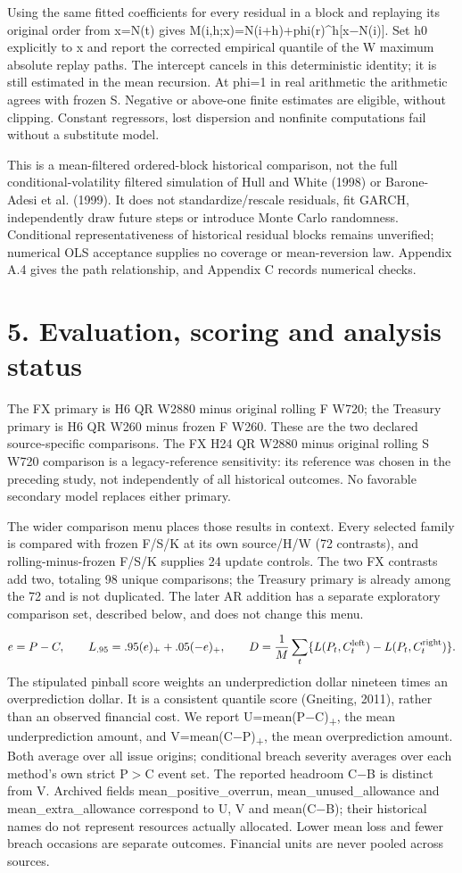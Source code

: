 \documentclass[10pt,a4paper]{article}
\begin{document}
Using the same fitted coefficients for every residual in a block and replaying its original order from x=N(t) gives M(i,h;x)=N(i+h)+phi(r)\textasciicircum{}h[x\(-\)N(i)]. Set h0 explicitly to x and report the corrected empirical quantile of the W maximum absolute replay paths. The intercept cancels in this deterministic identity; it is still estimated in the mean recursion. At phi=1 in real arithmetic the arithmetic agrees with frozen S. Negative or above-one finite estimates are eligible, without clipping. Constant regressors, lost dispersion and nonfinite computations fail without a substitute model.

This is a mean-filtered ordered-block historical comparison, not the full conditional-volatility filtered simulation of Hull and White (1998) or Barone-Adesi et al. (1999). It does not standardize/rescale residuals, fit GARCH, independently draw future steps or introduce Monte Carlo randomness. Conditional representativeness of historical residual blocks remains unverified; numerical OLS acceptance supplies no coverage or mean-reversion law. Appendix A.4 gives the path relationship, and Appendix C records numerical checks.

\section*{5. Evaluation, scoring and analysis status}
The FX primary is H6 QR W2880 minus original rolling F W720; the Treasury primary is H6 QR W260 minus frozen F W260. These are the two declared source-specific comparisons. The FX H24 QR W2880 minus original rolling S W720 comparison is a legacy-reference sensitivity: its reference was chosen in the preceding study, not independently of all historical outcomes. No favorable secondary model replaces either primary.

The wider comparison menu places those results in context. Every selected family is compared with frozen F/S/K at its own source/H/W (72 contrasts), and rolling-minus-frozen F/S/K supplies 24 update controls. The two FX contrasts add two, totaling 98 unique comparisons; the Treasury primary is already among the 72 and is not duplicated. The later AR addition has a separate exploratory comparison set, described below, and does not change this menu.

\[
e=P-C,\qquad L_{.95}=.95(e)_+ +.05(-e)_+,\qquad D=\frac1M\sum_t\{L(P_t,C_t^{\rm left})-L(P_t,C_t^{\rm right})\}.
\]
The stipulated pinball score weights an underprediction dollar nineteen times an overprediction dollar. It is a consistent quantile score (Gneiting, 2011), rather than an observed financial cost. We report U=mean(P\(-\)C)\textsubscript{+}, the mean underprediction amount, and V=mean(C\(-\)P)\textsubscript{+}, the mean overprediction amount. Both average over all issue origins; conditional breach severity averages over each method's own strict P\( > \)C event set. The reported headroom C\(-\)B is distinct from V. Archived fields mean\_positive\_overrun, mean\_unused\_allowance and mean\_extra\_allowance correspond to U, V and mean(C\(-\)B); their historical names do not represent resources actually allocated. Lower mean loss and fewer breach occasions are separate outcomes. Financial units are never pooled across sources.
\end{document}
